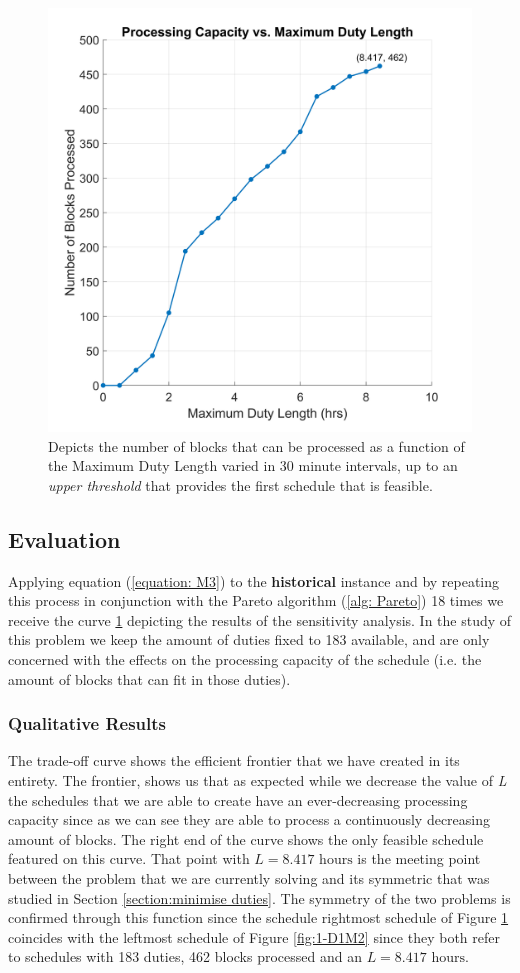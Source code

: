 
\begin{figure}
    \centering
    \includegraphics[width=0.46\linewidth]{[1] - chapter/Image Files/1-D1M3.png}
    \caption{Depicts the number of blocks that can be processed as a function of the Maximum Duty Length varied in 30 minute intervals, up to an \textit{upper threshold} that provides the first schedule that is feasible.}
    \label{fig:1-D1M3}
\end{figure}



\subsection*{Evaluation}
Applying equation (\ref{equation: M3}) to the \textbf{historical} instance and by repeating this process in conjunction with the Pareto algorithm (\ref{alg: Pareto}) 18 times we receive the curve \ref{fig:1-D1M3} depicting the results of the sensitivity analysis. In the study of this problem we keep the amount of duties fixed to 183 available, and are only concerned with the effects on the processing capacity of the schedule (i.e. the amount of blocks that can fit in those duties).

\subsubsection*{Qualitative Results}
The trade-off curve shows the efficient frontier that we have created in its entirety. The frontier, shows us that as expected while we decrease the value of \textit{L} the schedules that we are able to create have an ever-decreasing processing capacity since as we can see they are able to process a continuously decreasing amount of blocks. The right end of the curve shows the only feasible schedule featured on this curve. That point with $L=8.417 \text{ hours}$ is the meeting point between the problem that we are currently solving and its symmetric that was studied in Section \ref{section:minimise duties}. The symmetry of the two problems is confirmed through this function since the schedule rightmost schedule of Figure \ref{fig:1-D1M3} coincides with the leftmost schedule of Figure \ref{fig:1-D1M2} since they both refer to schedules with 183 duties, 462 blocks processed and an $L=8.417 \text{ hours}$.

